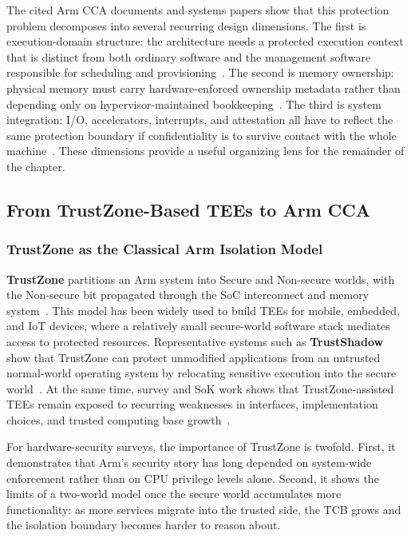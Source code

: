 The cited Arm CCA documents and systems papers show that this protection problem decomposes into several recurring design dimensions. The first is execution-domain structure: the architecture needs a protected execution context that is distinct from both ordinary software and the management software responsible for scheduling and provisioning~\cite{li2022cca,arm_cca_spec,arm_rme_spec}. The second is memory ownership: physical memory must carry hardware-enforced ownership metadata rather than depending only on hypervisor-maintained bookkeeping~\cite{arm_cca_spec,arm_rme_spec,linux_arm_cca_doc}. The third is system integration: I/O, accelerators, interrupts, and attestation all have to reflect the same protection boundary if confidentiality is to survive contact with the whole machine~\cite{arm_smmu_spec,acai2023,bertschi2026devlore,arm_rmm_spec,eat_rfc}. These dimensions provide a useful organizing lens for the remainder of the chapter.

\subsection{From TrustZone-Based TEEs to Arm CCA}

\subsubsection{TrustZone as the Classical Arm Isolation Model}

\textbf{TrustZone} partitions an Arm system into Secure and Non-secure worlds, with the Non-secure bit propagated through the SoC interconnect and memory system~\cite{arm_trustzone_whitepaper,pinto2019trustzone}. This model has been widely used to build TEEs for mobile, embedded, and IoT devices, where a relatively small secure-world software stack mediates access to protected resources. Representative systems such as \textbf{TrustShadow} show that TrustZone can protect unmodified applications from an untrusted normal-world operating system by relocating sensitive execution into the secure world~\cite{guan2017trustshadow}. At the same time, survey and SoK work shows that TrustZone-assisted TEEs remain exposed to recurring weaknesses in interfaces, implementation choices, and trusted computing base growth~\cite{pinto2019trustzone,cerdeira2020trustzone}.

For hardware-security surveys, the importance of TrustZone is twofold. First, it demonstrates that Arm's security story has long depended on system-wide enforcement rather than on CPU privilege levels alone. Second, it shows the limits of a two-world model once the secure world accumulates more functionality: as more services migrate into the trusted side, the TCB grows and the isolation boundary becomes harder to reason about.

